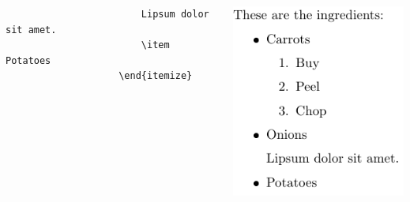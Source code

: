 \begin{frame}[fragile]
\begin{columns}
\begin{column}{0.5\textwidth}
\begin{codebox}
\begin{verbatim}
                        Lipsum dolor sit amet.
                        \item Potatoes
                    \end{itemize}
                \end{verbatim}
            \end{codebox}
        \end{column}
        \begin{column}{0.5\textwidth}
            \includegraphics[width=\linewidth,height=0.8\textheight,keepaspectratio]{assets/lijstItemEnumEN.pdf}
        \end{column}
    \end{columns}
\end{frame}

